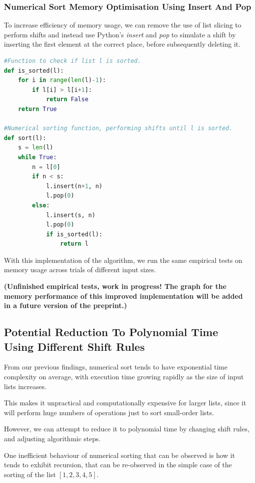 \documentclass[12pt]{article}
\begin{document}
\subsubsection{Numerical Sort Memory Optimisation Using Insert And Pop}

To increase efficiency of memory usage, we can remove the use of list slicing to perform shifts and instead use Python's \emph{insert} and \emph{pop} to simulate a shift by inserting the first element at the correct place, before subsequently deleting it.

\begin{lstlisting}[language=Python]
#Function to check if list l is sorted.
def is_sorted(l):
    for i in range(len(l)-1):
        if l[i] > l[i+1]:
            return False
    return True

#Numerical sorting function, performing shifts until l is sorted.
def sort(l):
    s = len(l)
    while True:
        n = l[0]
        if n < s:
            l.insert(n+1, n)
            l.pop(0)
        else:
            l.insert(s, n)
            l.pop(0)
            if is_sorted(l):
                return l
\end{lstlisting}

With this implementation of the algorithm, we run the same empirical tests on memory usage across trials of different input sizes.

\textbf{(Unfinished empirical tests, work in progress! The graph for the memory performance of this improved implementation will be added in a future version of the preprint.)}

\subsection{Potential Reduction To Polynomial Time Using Different Shift Rules}

From our previous findings, numerical sort tends to have exponential time complexity on average, with execution time growing rapidly as the size of input lists increases.

This makes it unpractical and computationally expensive for larger lists, since it will perform huge numbers of operations just to sort small-order lists.

However, we can attempt to reduce it to polynomial time by changing shift rules, and adjusting algorithmic steps.

One inefficient behaviour of numerical sorting that can be observed is how it tends to exhibit recursion, that can be re-observed in the simple case of the sorting of the list $[1,2,3,4,5]$.
\end{document}

